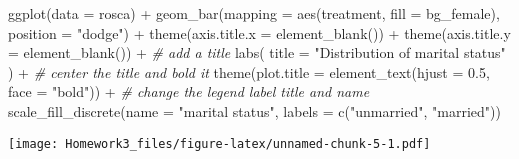 \documentclass[
]{article}
\newenvironment{Shaded}{\begin{snugshade}}{\end{snugshade}}
\newcommand{\AttributeTok}[1]{\textcolor[rgb]{0.77,0.63,0.00}{#1}}
\newcommand{\CommentTok}[1]{\textcolor[rgb]{0.56,0.35,0.01}{\textit{#1}}}
\newcommand{\FloatTok}[1]{\textcolor[rgb]{0.00,0.00,0.81}{#1}}
\newcommand{\FunctionTok}[1]{\textcolor[rgb]{0.00,0.00,0.00}{#1}}
\newcommand{\NormalTok}[1]{#1}
\newcommand{\OtherTok}[1]{\textcolor[rgb]{0.56,0.35,0.01}{#1}}
\newcommand{\SpecialCharTok}[1]{\textcolor[rgb]{0.00,0.00,0.00}{#1}}
\newcommand{\StringTok}[1]{\textcolor[rgb]{0.31,0.60,0.02}{#1}}
\begin{document}
\begin{Shaded}
\end{Shaded}

\begin{Shaded}
\begin{Highlighting}[]
\FunctionTok{ggplot}\NormalTok{(}\AttributeTok{data =}\NormalTok{ rosca) }\SpecialCharTok{+} 
  \FunctionTok{geom\_bar}\NormalTok{(}\AttributeTok{mapping =} \FunctionTok{aes}\NormalTok{(treatment, }\AttributeTok{fill =}\NormalTok{ bg\_female), }
           \AttributeTok{position =} \StringTok{"dodge"}\NormalTok{) }\SpecialCharTok{+} 
  \FunctionTok{theme}\NormalTok{(}\AttributeTok{axis.title.x =} \FunctionTok{element\_blank}\NormalTok{()) }\SpecialCharTok{+} 
  \FunctionTok{theme}\NormalTok{(}\AttributeTok{axis.title.y =} \FunctionTok{element\_blank}\NormalTok{()) }\SpecialCharTok{+} 
  \CommentTok{\# add a title }
  \FunctionTok{labs}\NormalTok{(}
    \AttributeTok{title =} \StringTok{"Distribution of marital status"}
\NormalTok{  ) }\SpecialCharTok{+} 
  \CommentTok{\# center the title and bold it}
  \FunctionTok{theme}\NormalTok{(}\AttributeTok{plot.title =} \FunctionTok{element\_text}\NormalTok{(}\AttributeTok{hjust =} \FloatTok{0.5}\NormalTok{, }\AttributeTok{face =} \StringTok{"bold"}\NormalTok{)) }\SpecialCharTok{+} 
  \CommentTok{\# change the legend label title and name}
  \FunctionTok{scale\_fill\_discrete}\NormalTok{(}\AttributeTok{name =} \StringTok{"marital status"}\NormalTok{,}
                      \AttributeTok{labels =} \FunctionTok{c}\NormalTok{(}\StringTok{"unmarried"}\NormalTok{, }\StringTok{"married"}\NormalTok{)) }
\end{Highlighting}
\end{Shaded}

\texttt{[image: Homework3\_files/figure-latex/unnamed-chunk-5-1.pdf]}
\end{document}
